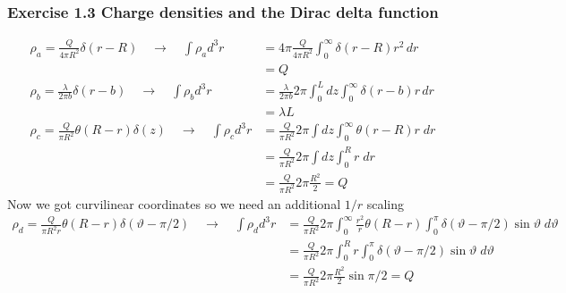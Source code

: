 \documentclass[10pt,a4paper]{book}
\theoremstyle{definition}
\begin{document}
\subsubsection{Exercise 1.3 Charge densities and the Dirac delta function}
\begin{align}
\rho_a=\frac{Q}{4\pi R^2}\delta(r-R)\quad\rightarrow\quad \int\rho_a d^3r&=4\pi\frac{Q}{4\pi R^2}\int_0^\infty\delta(r-R)r^2\,dr\\&=Q\\
\rho_b=\frac{\lambda}{2\pi b}\delta(r-b)\quad\rightarrow\quad \int\rho_b d^3r&=\frac{\lambda}{2\pi b}2\pi\int_0^Ldz\int_0^\infty \delta(r-b)r\,dr\\&=\lambda L\\
\rho_c=\frac{Q}{\pi R^2}\theta(R-r)\delta(z)\quad\rightarrow\quad \int\rho_c d^3r&=\frac{Q}{\pi R^2}2\pi\int dz\int_0^\infty\theta(r-R)r\;dr\\
&=\frac{Q}{\pi R^2}2\pi\int dz\int_0^Rr\;dr\\
&=\frac{Q}{\pi R^2}2\pi\frac{R^2}{2}=Q
\end{align}
Now we got curvilinear coordinates so we need an additional $1/r$ scaling
\begin{align}
\rho_d=\frac{Q}{\pi R^2r}\theta(R-r)\delta(\vartheta-\pi/2)\quad\rightarrow\quad \int\rho_d d^3r&=\frac{Q}{\pi R^2}2\pi\int_0^\infty \frac{r^2}{r}\theta(R-r)\int_0^\pi\delta(\vartheta-\pi/2)\sin\vartheta\;d\vartheta\\
&=\frac{Q}{\pi R^2}2\pi\int_0^R r\int_0^\pi\delta(\vartheta-\pi/2)\sin\vartheta\;d\vartheta\\
&=\frac{Q}{\pi R^2}2\pi \frac{R^2}{2}\sin\pi/2=Q
\end{align}
\end{document}

